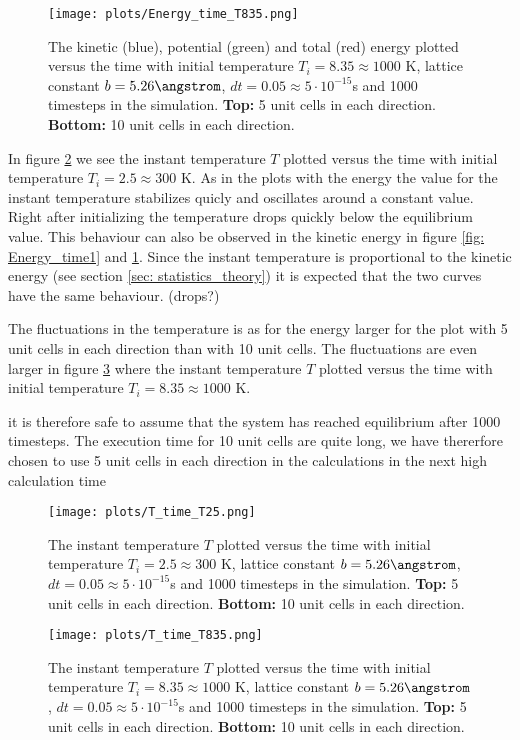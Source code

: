 \documentclass[11pt,a4wide]{article}
\begin{document}
\begin{figure}[htp]
\centering
\texttt{[image: plots/Energy\_time\_T835.png]}
\caption{The kinetic (blue), potential (green) and total (red) energy plotted versus the time with initial temperature $T_i = 8.35 \approx 1000$ K, lattice constant $b=5.26 \angstrom$, $dt=0.05\approx  5\cdot 10^{-15}$s and 1000 timesteps in the simulation. \textbf{Top:} 5 unit cells in each direction. \textbf{Bottom:} 10 unit cells in each direction.}
\label{fig: Energy_time2}
\end{figure}

In figure \ref{fig: T_time1} we see the instant temperature $T$ plotted versus the time with initial temperature $T_i = 2.5 \approx 300$ K. As in the plots with the energy the value for the instant temperature stabilizes quicly and oscillates around a constant value. Right after initializing the temperature drops quickly below the equilibrium value. This behaviour can also be observed in the kinetic energy in figure \ref{fig: Energy_time1} and \ref{fig: Energy_time2}. Since the instant temperature is proportional to the kinetic energy (see section \ref{sec: statistics_theory}) it is expected that the two curves have the same behaviour.  (drops?)

The fluctuations in the temperature is as for the energy larger for the plot with 5 unit cells in each direction than with 10 unit cells. The fluctuations are even larger in figure \ref{fig: T_time2} where the instant temperature $T$ plotted versus the time with initial temperature $T_i = 8.35 \approx 1000$ K.


 it is therefore safe to assume that the system has reached equilibrium after 1000 timesteps. 
The execution time for 10 unit cells are quite long, we have thererfore chosen to use 5 unit cells in each direction in the calculations in the next 
high calculation time



\begin{figure}[htp]
\centering
\texttt{[image: plots/T\_time\_T25.png]}
\caption{The instant temperature $T$ plotted versus the time with initial temperature $T_i = 2.5 \approx 300$ K, lattice constant $b=5.26 \angstrom$, $dt=0.05\approx  5\cdot 10^{-15}$s and 1000 timesteps in the simulation. \textbf{Top:} 5 unit cells in each direction. \textbf{Bottom:} 10 unit cells in each direction.}
\label{fig: T_time1}
\end{figure}

\begin{figure}[htp]
\centering
\texttt{[image: plots/T\_time\_T835.png]}
\caption{The instant temperature $T$ plotted versus the time with initial temperature $T_i = 8.35 \approx 1000$ K, lattice constant $b=5.26 \angstrom$, $dt=0.05\approx  5\cdot 10^{-15}$s and 1000 timesteps in the simulation. \textbf{Top:} 5 unit cells in each direction. \textbf{Bottom:} 10 unit cells in each direction.}
\label{fig: T_time2}
\end{figure}
\end{document}
